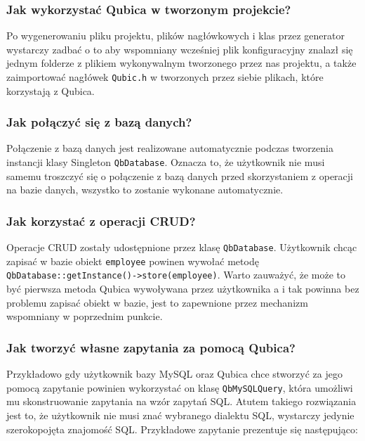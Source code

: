 \documentclass[12pt]{report}
\begin{document}
\subsubsection{Jak wykorzystać Qubica w tworzonym projekcie?}

Po wygenerowaniu pliku projektu, plików nagłówkowych i klas przez generator wystarczy zadbać o to aby wspomniany wcześniej plik konfiguracyjny 
znalazł się jednym folderze z plikiem wykonywalnym tworzonego przez nas projektu, a także zaimportować nagłówek {\tt Qubic.h} w tworzonych przez siebie plikach, które korzystają
z Qubica.

\subsubsection{Jak połączyć się z bazą danych?}

Połączenie z bazą danych jest realizowane automatycznie podczas tworzenia instancji klasy Singleton {\tt QbDatabase}. Oznacza to, że użytkownik nie musi samemu troszczyć
się o połączenie z bazą danych przed skorzystaniem z operacji na bazie danych, wszystko to zostanie wykonane automatycznie.

\subsubsection{Jak korzystać z operacji CRUD?}

Operacje CRUD zostały udostępnione przez klasę {\tt QbDatabase}. Użytkownik chcąc zapisać w bazie obiekt {\tt employee} powinen wywołać metodę 
{\tt QbDatabase::get\-Instance()->store(employee)}. Warto zauważyć, że może to być pierwsza metoda Qubica wywoływana przez użytkownika a i tak powinna bez problemu
zapisać obiekt w bazie, jest to zapewnione przez mechanizm wspomniany w poprzednim punkcie.

\subsubsection{Jak tworzyć własne zapytania za pomocą Qubica?}

Przykładowo gdy użytkownik bazy MySQL oraz Qubica chce stworzyć za jego pomocą zapytanie powinien wykorzystać on klasę {\tt QbMySQLQuery}, która umożliwi mu
skonstruowanie zapytania na wzór zapytań SQL. Atutem takiego rozwiązania jest to, że użytkownik nie musi znać wybranego dialektu SQL, wystarczy jedynie szerokopojęta
znajomość SQL. Przykładowe zapytanie prezentuje się następująco:
\end{document}
